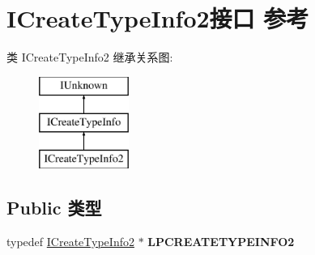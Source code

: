 \hypertarget{interface_i_create_type_info2}{}\section{I\+Create\+Type\+Info2接口 参考}
\label{interface_i_create_type_info2}
类 I\+Create\+Type\+Info2 继承关系图\+:\begin{figure}[H]
\begin{center}
\leavevmode
\includegraphics[height=3.000000cm]{interface_i_create_type_info2}
\end{center}
\end{figure}
\subsection*{Public 类型}
\begin{DoxyCompactItemize}
\item 
\mbox{\label{interface_i_create_type_info2_a2bd0a776774ba150d074f4b85534d525}} 
typedef \hyperlink{interface_i_create_type_info2}{I\+Create\+Type\+Info2} $\ast$ {\bfseries L\+P\+C\+R\+E\+A\+T\+E\+T\+Y\+P\+E\+I\+N\+F\+O2}
\end{DoxyCompactItemize}
